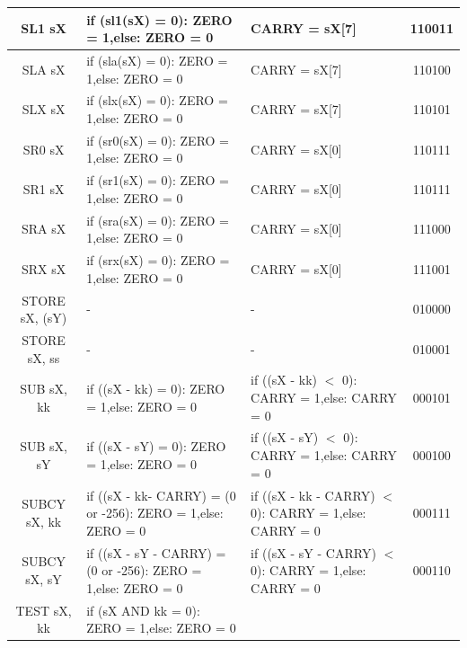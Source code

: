 \documentclass[bibliography=totoc,listof=totoc,index=totoc]{scrartcl}
\begin{document}
\begin{small}
\begin{longtable}{||c|p{6cm}|p{6cm}|c||}
    SL1 sX & if (sl1(sX) = 0): ZERO = 1,\newline else: ZERO = 0
    & CARRY = sX[7] & 110011 \\ \hline
    SLA sX & if (sla(sX) = 0): ZERO = 1,\newline else: ZERO = 0
    & CARRY = sX[7] & 110100 \\ \hline
    SLX sX & if (slx(sX) = 0): ZERO = 1,\newline else: ZERO = 0
    & CARRY = sX[7] & 110101 \\ \hline
    SR0 sX & if (sr0(sX) = 0): ZERO = 1,\newline else: ZERO = 0
    & CARRY = sX[0] & 110111 \\ \hline
    SR1 sX & if (sr1(sX) = 0): ZERO = 1,\newline else: ZERO = 0
    & CARRY = sX[0] & 110111 \\ \hline
    SRA sX & if (sra(sX) = 0): ZERO = 1,\newline else: ZERO = 0
    & CARRY = sX[0] & 111000 \\ \hline
    SRX sX & if (srx(sX) = 0): ZERO = 1,\newline else: ZERO = 0
    & CARRY = sX[0] & 111001 \\ \hline
    STORE sX, (sY) & - & - & 010000 \\ \hline
    STORE sX, ss & - & - & 010001 \\ \hline
    SUB sX, kk & if ((sX - kk) = 0): ZERO = 1,\newline else: ZERO = 0
    & if ((sX - kk) $<$ 0): CARRY = 1,\newline else: CARRY = 0 & 000101 \\ \hline
    SUB sX, sY & if ((sX - sY) = 0): ZERO = 1,\newline else: ZERO = 0
    & if ((sX - sY) $<$ 0): CARRY = 1,\newline else: CARRY = 0 & 000100 \\ \hline
    SUBCY sX, kk & if ((sX - kk- CARRY) = (0 or -256): ZERO = 1,\newline else: ZERO = 0
    & if ((sX - kk - CARRY) $<$ 0): CARRY = 1,\newline else: CARRY = 0 & 000111 \\ \hline
    SUBCY sX, sY & if ((sX - sY - CARRY) = (0 or -256): ZERO = 1,\newline else: ZERO = 0
    & if ((sX - sY - CARRY) $<$ 0): CARRY = 1,\newline else: CARRY = 0 & 000110 \\ \hline
    TEST sX, kk & if (sX AND kk = 0): ZERO = 1,\newline else: ZERO = 0

\end{longtable}
\end{small}
\end{document}
